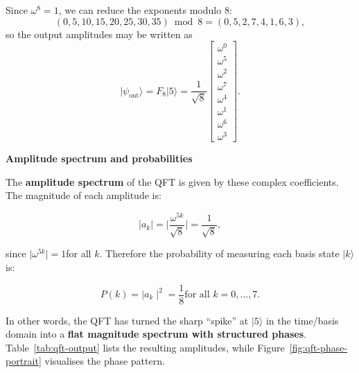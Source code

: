 \documentclass[a4paper,11pt]{article}
\begin{document}
Since $\omega^{8} = 1$, we can reduce the exponents modulo $8$:
\[
  (0, 5, 10, 15, 20, 25, 30, 35) \bmod 8 = (0, 5, 2, 7, 4, 1, 6, 3),
\]
so the output amplitudes may be written as
\[
  \lvert \psi_{\text{out}} \rangle
  = F_8 \lvert 5 \rangle
  = \frac{1}{\sqrt{8}}
    \begin{bmatrix}
      \omega^{0} \\
      \omega^{5} \\
      \omega^{2} \\
      \omega^{7} \\
      \omega^{4} \\
      \omega^{1} \\
      \omega^{6} \\
      \omega^{3}
    \end{bmatrix}.
\]

\textbf{Amplitude spectrum and probabilities}

The \textbf{amplitude spectrum} of the QFT is given by these complex coefficients. The magnitude of each amplitude is:

\[\mid a_{k} \mid = \mid \frac{\omega^{5k}}{\sqrt{8}} \mid = \frac{1}{\sqrt{8}},
\]

since \(\mid \omega^{5k} \mid = 1\)for all \(k\). Therefore the probability of measuring each basis state \(\mid k\rangle\)is:

\[P(k) = \mid a_{k} \mid^{2} = \frac{1}{8}\text{for all }k = 0,\ldots,7.
\]

In other words, the QFT has turned the sharp ``spike'' at \(\mid 5\rangle\) in the time/basis domain into a \textbf{flat magnitude spectrum with structured phases}. Table~\ref{tab:qft-output} lists the resulting amplitudes, while Figure~\ref{fig:qft-phase-portrait} visualises the phase pattern.
\end{document}
